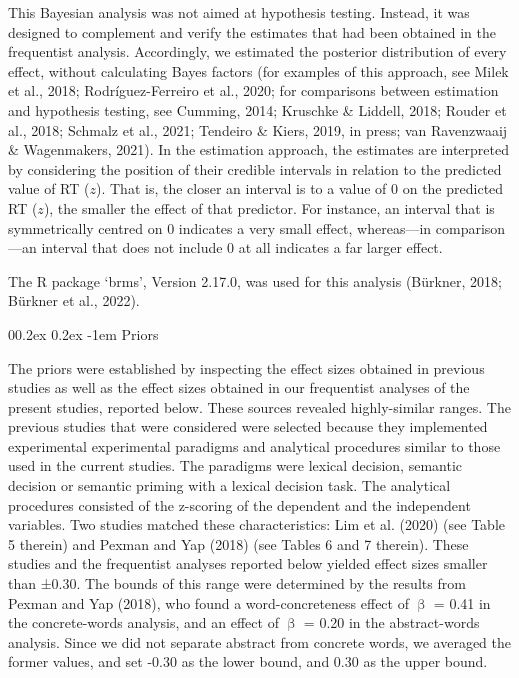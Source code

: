 \documentclass[
  12pt,
  man,floatsintext]{apa7}
\makeatletter
\let\oldparagraph\paragraph
\renewcommand{\paragraph}[1]{\oldparagraph{#1}\mbox{}}
\renewcommand{\paragraph}{\@startsection{paragraph}{4}{\parindent}%
  {0\baselineskip \@plus 0.2ex \@minus 0.2ex}%
  {-1em}%
  {\normalfont\normalsize\bfseries\itshape\typesectitle}}
\makeatother
\begin{document}
This Bayesian analysis was not aimed at hypothesis testing. Instead, it was designed to complement and verify the estimates that had been obtained in the frequentist analysis. Accordingly, we estimated the posterior distribution of every effect, without calculating Bayes factors (for examples of this approach, see Milek et al., 2018; Rodríguez-Ferreiro et al., 2020; for comparisons between estimation and hypothesis testing, see Cumming, 2014; Kruschke \& Liddell, 2018; Rouder et al., 2018; Schmalz et al., 2021; Tendeiro \& Kiers, 2019, in press; van Ravenzwaaij \& Wagenmakers, 2021). In the estimation approach, the estimates are interpreted by considering the position of their credible intervals in relation to the predicted value of RT (\(z\)). That is, the closer an interval is to a value of 0 on the predicted RT (\(z\)), the smaller the effect of that predictor. For instance, an interval that is symmetrically centred on 0 indicates a very small effect, whereas---in comparison---an interval that does not include 0 at all indicates a far larger effect.

The R package `brms', Version 2.17.0, was used for this analysis (Bürkner, 2018; Bürkner et al., 2022).

\hypertarget{priors}{%
\paragraph{Priors}\label{priors}}

The priors were established by inspecting the effect sizes obtained in previous studies as well as the effect sizes obtained in our frequentist analyses of the present studies, reported below. These sources revealed highly-similar ranges. The previous studies that were considered were selected because they implemented experimental experimental paradigms and analytical procedures similar to those used in the current studies. The paradigms were lexical decision, semantic decision or semantic priming with a lexical decision task. The analytical procedures consisted of the z-scoring of the dependent and the independent variables. Two studies matched these characteristics: Lim et al. (2020) (see Table 5 therein) and Pexman and Yap (2018) (see Tables 6 and 7 therein). These studies and the frequentist analyses reported below yielded effect sizes smaller than ±0.30. The bounds of this range were determined by the results from Pexman and Yap (2018), who found a word-concreteness effect of \(\upbeta\) = 0.41 in the concrete-words analysis, and an effect of \(\upbeta\) = 0.20 in the abstract-words analysis. Since we did not separate abstract from concrete words, we averaged the former values, and set -0.30 as the lower bound, and 0.30 as the upper bound.
\end{document}
